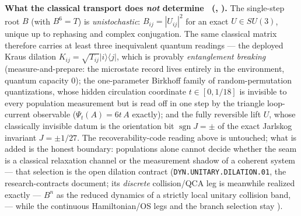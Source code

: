 \noindent\textbf{What the classical transport does \emph{not} determine \mE\
(, ).}  The single-step
root $B$ (with $B^6=T$) is \emph{unistochastic}: $B_{ij}=|U_{ij}|^2$ for an exact $U\in SU(3)$, unique up
to rephasing and complex conjugation.  The same classical matrix therefore carries at least three
inequivalent quantum readings --- the deployed Kraus dilation $K_{ij}=\sqrt{T_{ij}}|i\rangle\langle j|$,
which is provably \emph{entanglement breaking} (measure-and-prepare: the microstate record lives entirely
in the environment, quantum capacity $0$); the one-parameter Birkhoff family of random-permutation
quantizations, whose hidden circulation coordinate $t\in[0,1/18]$ is invisible to every population
measurement but is read off in one step by the triangle loop-current observable ($\Psi_t(A)=6t\,A$
exactly); and the fully reversible lift $U$, whose classically invisible datum is the orientation bit
$\operatorname{sgn}J=\pm$ of the exact Jarlskog invariant $J=\pm1/27$.  The recoverability-code reading
above is untouched; what is added is the honest boundary: populations alone cannot decide whether the seam
is a classical relaxation channel or the measurement shadow of a coherent system --- that selection is the
open dilation contract (\texttt{DYN.UNITARY.DILATION.01}, the research-contracts document; its
\emph{discrete} collision/QCA leg is meanwhile realized exactly --- $B^n$ as the reduced dynamics of a
strictly local unitary collision band, \veri{v984\_markov\_qca\_dilation.py} --- while the continuous
Hamiltonian/OS legs and the branch selection stay \mO).

